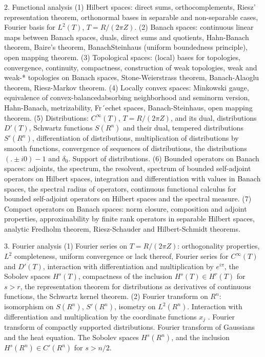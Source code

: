 2. Functional analysis
(1) Hilbert spaces: direct sums, orthocomplements, Riesz' representation theorem, orthonormal bases in  separable and non-separable cases, Fourier basis for $L^2 (T)$, $T = R/(2\pi Z)$.
(2) Banach spaces: continuous linear maps between Banach spaces, duals, direct sums and quotients, Hahn-Banach theorem, Baire's theorem, BanachSteinhaus (uniform boundedness principle), open mapping theorem.
(3) Topological spaces: (local) bases for topologies, convergence, continuity, compactness, construction of weak topologies, weak and weak-* topologies on Banach spaces, Stone-Weierstrass theorem, Banach-Alaoglu theorem, Riesz-Markov theorem.
(4) Locally convex spaces: Minkowski gauge, equivalence of convex-balancedabsorbing neighborhood and seminorm version, Hahn-Banach, metrizability, Fr´echet spaces, Banach-Steinhaus, open mapping theorem.
(5) Distributions: $C^{\infty}(T)$, $T = R/(2\pi Z)$, and its dual, distributions $D' (T)$, Schwartz functions $S(R^n)$ and their dual, tempered distributions $S' (R^n)$, differentiation of distributions, multiplication of distributions by smooth functions, convergence of sequences of distributions, the distributions $(. ± i0)-1$ and $δ_0$. Support of distributions.
(6) Bounded operators on Banach spaces: adjoints, the spectrum, the resolvent, spectrum of bounded self-adjoint operators on Hilbert spaces, integration and differentiation with values in Banach spaces, the spectral radius of operators, continuous functional calculus for bounded self-adjoint operators on Hilbert spaces and the spectral measure.
(7) Compact operators on Banach spaces: norm closure, composition and adjoint properties, approximability by finite rank operators in separable Hilbert spaces, analytic Fredholm theorem, Riesz-Schauder and Hilbert-Schmidt theorems.

3. Fourier analysis
(1) Fourier series on $T = R/(2\pi Z)$: orthogonality properties, $L^2$ completeness, uniform convergence or lack thereof, Fourier series for $C^{\infty}(T)$ and $D' (T)$, interaction with differentiation and multiplication by $e^{i\pi}$, the Sobolev spaces $H^s (T)$, compactness of the inclusion $H^s (T) \in H^r (T)$ for $s > r$, the representation theorem for distributions as derivatives of continuous functions, the Schwartz kernel theorem.
(2) Fourier transform on $R^n$: isomorphism on $S(R^n)$, $S' (R^n)$, isometry on $L^2 (R^n)$. Interaction with differentiation and multiplication by the coordinate functions $x_j$ . Fourier transform of compactly supported distributions. Fourier transform of Gaussians and the heat equation. The Sobolev spaces $H^s (R^n)$, and the inclusion $H^s (R^n) \in C' (R^n)$ for $s > n/2$.

